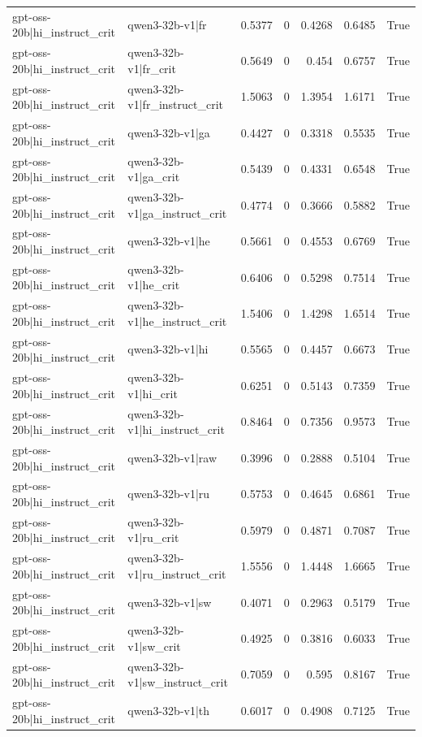 \begin{table}
\begin{tabular}{l l r r r r l}
gpt-oss-20b|hi_instruct_crit & qwen3-32b-v1|fr & 0.5377 & 0 & 0.4268 & 0.6485 & True \\
gpt-oss-20b|hi_instruct_crit & qwen3-32b-v1|fr_crit & 0.5649 & 0 & 0.454 & 0.6757 & True \\
gpt-oss-20b|hi_instruct_crit & qwen3-32b-v1|fr_instruct_crit & 1.5063 & 0 & 1.3954 & 1.6171 & True \\
gpt-oss-20b|hi_instruct_crit & qwen3-32b-v1|ga & 0.4427 & 0 & 0.3318 & 0.5535 & True \\
gpt-oss-20b|hi_instruct_crit & qwen3-32b-v1|ga_crit & 0.5439 & 0 & 0.4331 & 0.6548 & True \\
gpt-oss-20b|hi_instruct_crit & qwen3-32b-v1|ga_instruct_crit & 0.4774 & 0 & 0.3666 & 0.5882 & True \\
gpt-oss-20b|hi_instruct_crit & qwen3-32b-v1|he & 0.5661 & 0 & 0.4553 & 0.6769 & True \\
gpt-oss-20b|hi_instruct_crit & qwen3-32b-v1|he_crit & 0.6406 & 0 & 0.5298 & 0.7514 & True \\
gpt-oss-20b|hi_instruct_crit & qwen3-32b-v1|he_instruct_crit & 1.5406 & 0 & 1.4298 & 1.6514 & True \\
gpt-oss-20b|hi_instruct_crit & qwen3-32b-v1|hi & 0.5565 & 0 & 0.4457 & 0.6673 & True \\
gpt-oss-20b|hi_instruct_crit & qwen3-32b-v1|hi_crit & 0.6251 & 0 & 0.5143 & 0.7359 & True \\
gpt-oss-20b|hi_instruct_crit & qwen3-32b-v1|hi_instruct_crit & 0.8464 & 0 & 0.7356 & 0.9573 & True \\
gpt-oss-20b|hi_instruct_crit & qwen3-32b-v1|raw & 0.3996 & 0 & 0.2888 & 0.5104 & True \\
gpt-oss-20b|hi_instruct_crit & qwen3-32b-v1|ru & 0.5753 & 0 & 0.4645 & 0.6861 & True \\
gpt-oss-20b|hi_instruct_crit & qwen3-32b-v1|ru_crit & 0.5979 & 0 & 0.4871 & 0.7087 & True \\
gpt-oss-20b|hi_instruct_crit & qwen3-32b-v1|ru_instruct_crit & 1.5556 & 0 & 1.4448 & 1.6665 & True \\
gpt-oss-20b|hi_instruct_crit & qwen3-32b-v1|sw & 0.4071 & 0 & 0.2963 & 0.5179 & True \\
gpt-oss-20b|hi_instruct_crit & qwen3-32b-v1|sw_crit & 0.4925 & 0 & 0.3816 & 0.6033 & True \\
gpt-oss-20b|hi_instruct_crit & qwen3-32b-v1|sw_instruct_crit & 0.7059 & 0 & 0.595 & 0.8167 & True \\
gpt-oss-20b|hi_instruct_crit & qwen3-32b-v1|th & 0.6017 & 0 & 0.4908 & 0.7125 & True \\

\end{tabular}
\end{table}
